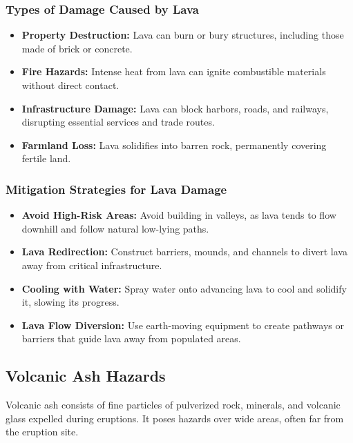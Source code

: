 \documentclass{article}
\begin{document}
\subsubsection{Types of Damage Caused by Lava}
\begin{itemize}
    \item \textbf{Property Destruction:} Lava can burn or bury structures, including those made of brick or concrete.
    \item \textbf{Fire Hazards:} Intense heat from lava can ignite combustible materials without direct contact.
    \item \textbf{Infrastructure Damage:} Lava can block harbors, roads, and railways, disrupting essential services and trade routes.
    \item \textbf{Farmland Loss:} Lava solidifies into barren rock, permanently covering fertile land.
\end{itemize}

\subsubsection{Mitigation Strategies for Lava Damage}
\begin{itemize}
    \item \textbf{Avoid High-Risk Areas:} Avoid building in valleys, as lava tends to flow downhill and follow natural low-lying paths.
    \item \textbf{Lava Redirection:} Construct barriers, mounds, and channels to divert lava away from critical infrastructure.
    \item \textbf{Cooling with Water:} Spray water onto advancing lava to cool and solidify it, slowing its progress.
    \item \textbf{Lava Flow Diversion:} Use earth-moving equipment to create pathways or barriers that guide lava away from populated areas.
\end{itemize}

\subsection{Volcanic Ash Hazards}
Volcanic ash consists of fine particles of pulverized rock, minerals, and volcanic glass expelled during eruptions. It poses hazards over wide areas, often far from the eruption site.
\end{document}
